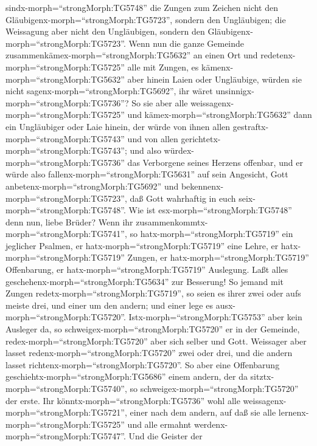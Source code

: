 sindx-morph=``strongMorph:TG5748'' die Zungen zum Zeichen nicht den
Gläubigenx-morph=``strongMorph:TG5723'', sondern den Ungläubigen; die
Weissagung aber nicht den Ungläubigen, sondern den
Gläubigenx-morph=``strongMorph:TG5723''.  Wenn nun die
ganze Gemeinde zusammenkämex-morph=``strongMorph:TG5632'' an einen Ort
und redetenx-morph=``strongMorph:TG5725'' alle mit Zungen, es
kämenx-morph=``strongMorph:TG5632'' aber hinein Laien oder Ungläubige,
würden sie nicht sagenx-morph=``strongMorph:TG5692'', ihr wäret
unsinnigx-morph=``strongMorph:TG5736''?  So sie aber alle
weissagenx-morph=``strongMorph:TG5725'' und
kämex-morph=``strongMorph:TG5632'' dann ein Ungläubiger oder Laie
hinein, der würde von ihnen allen gestraftx-morph=``strongMorph:TG5743''
und von allen gerichtetx-morph=``strongMorph:TG5743'';  und
also würdex-morph=``strongMorph:TG5736'' das Verborgene seines Herzens
offenbar, und er würde also fallenx-morph=``strongMorph:TG5631'' auf
sein Angesicht, Gott anbetenx-morph=``strongMorph:TG5692'' und
bekennenx-morph=``strongMorph:TG5723'', daß Gott wahrhaftig in euch
seix-morph=``strongMorph:TG5748''.  Wie ist
esx-morph=``strongMorph:TG5748'' denn nun, liebe Brüder? Wenn ihr
zusammenkommtx-morph=``strongMorph:TG5741'', so
hatx-morph=``strongMorph:TG5719'' ein jeglicher Psalmen, er
hatx-morph=``strongMorph:TG5719'' eine Lehre, er
hatx-morph=``strongMorph:TG5719'' Zungen, er
hatx-morph=``strongMorph:TG5719'' Offenbarung, er
hatx-morph=``strongMorph:TG5719'' Auslegung. Laßt alles
geschehenx-morph=``strongMorph:TG5634'' zur Besserung!  So
jemand mit Zungen redetx-morph=``strongMorph:TG5719'', so seien es ihrer
zwei oder aufs meiste drei, und einer um den andern; und einer lege es
ausx-morph=``strongMorph:TG5720''. 
Istx-morph=``strongMorph:TG5753'' aber kein Ausleger da, so
schweigex-morph=``strongMorph:TG5720'' er in der Gemeinde,
redex-morph=``strongMorph:TG5720'' aber sich selber und Gott.
 Weissager aber lasset redenx-morph=``strongMorph:TG5720''
zwei oder drei, und die andern lasset
richtenx-morph=``strongMorph:TG5720''.  So aber eine
Offenbarung geschiehtx-morph=``strongMorph:TG5686'' einem andern, der da
sitztx-morph=``strongMorph:TG5740'', so
schweigex-morph=``strongMorph:TG5720'' der erste.  Ihr
könntx-morph=``strongMorph:TG5736'' wohl alle
weissagenx-morph=``strongMorph:TG5721'', einer nach dem andern, auf daß
sie alle lernenx-morph=``strongMorph:TG5725'' und alle ermahnt
werdenx-morph=``strongMorph:TG5747''.  Und die Geister der
